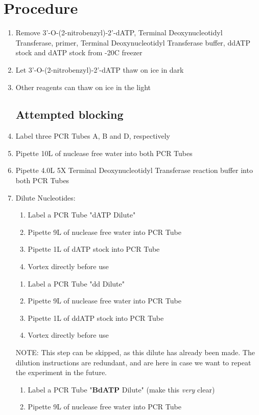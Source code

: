 \documentclass[letterpaper]{article}
\newcommand{\tdt}{Terminal Deoxynucleotidyl Transferase}
\newcommand{\C}{\degree{}C}
\newcommand{\uL}{\micro{}L}
\newcommand{\BdATP}{3'-O-(2-nitrobenzyl)-2'-dATP}
\begin{document}
\section{Procedure}%
\begin{enumerate} 
\subsection{Sample Preparation}
\item{Remove \BdATP{}, \tdt{}, primer, \tdt{}  buffer, ddATP stock and dATP stock from -20\C{} freezer}
\item{Let \BdATP{} thaw on ice in dark}
\item{Other reagents can thaw on ice in the light}
\subsection{Attempted blocking}
\item{Label three PCR Tubes A, B and D, respectively}
\item{Pipette 10\uL{} of nuclease free water into both PCR Tubes}
\item{Pipette 4.0\uL{} 5X \tdt{} reaction buffer into both PCR Tubes}
\item{Dilute Nucleotides:
\begin{enumerate}
\item{Label a PCR Tube "dATP Dilute"}
\item{Pipette 9\uL{} of nuclease free water into PCR Tube}
\item{Pipette 1\uL{} of dATP stock into PCR Tube}
\item{Vortex directly before use}
\end{enumerate}
\begin{enumerate}
\item{Label a PCR Tube "dd Dilute"}
\item{Pipette 9\uL{} of nuclease free water into PCR Tube}
\item{Pipette 1\uL{} of ddATP stock into PCR Tube}
\item{Vortex directly before use}
\end{enumerate}
NOTE: This step can be skipped, as this dilute has already been made. The dilution instructions are redundant, and are here in case we want to repeat the experiment in the future.
\begin{enumerate}
\item{Label a PCR Tube "\textbf{BdATP} Dilute" (make this \textit{very} clear)}
\item{Pipette 9\uL{} of nuclease free water into PCR Tube}

\end{enumerate}}
\end{enumerate}
\end{document}
